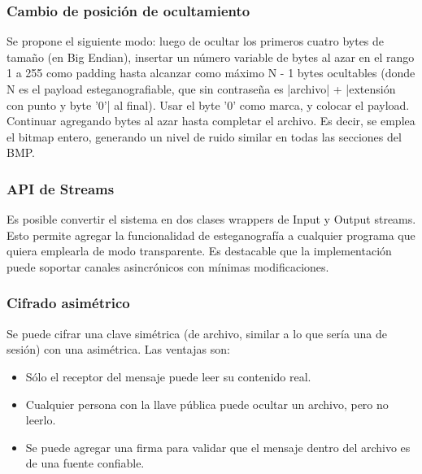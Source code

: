 \subsubsection{Cambio de posición de ocultamiento}

Se propone el siguiente modo: luego de ocultar los primeros cuatro bytes de tamaño (en Big Endian), insertar un número variable de bytes al azar en el rango 1 a 255 como padding hasta alcanzar como máximo N - 1 bytes ocultables (donde N es el payload esteganografiable, que sin contraseña es |archivo| + |extensión con punto y byte '0'| al final). Usar el byte '0' como marca, y colocar el payload. Continuar agregando bytes al azar hasta completar el archivo. Es decir, se emplea el bitmap entero, generando un nivel de ruido similar en todas las secciones del BMP.

\subsubsection{API de Streams}
Es posible convertir el sistema en dos clases wrappers de Input y Output streams. Esto permite agregar la funcionalidad de esteganografía a cualquier programa que quiera emplearla de modo transparente. Es destacable que la implementación puede soportar canales asincrónicos con mínimas modificaciones.


\subsubsection{Cifrado asimétrico}

Se puede cifrar una clave simétrica (de archivo, similar a lo que sería una de sesión) con una asimétrica. Las ventajas son:
\begin{itemize}
\item Sólo el receptor del mensaje puede leer su contenido real.
\item Cualquier persona con la llave pública puede ocultar un archivo, pero no leerlo.
\item Se puede agregar una firma para validar que el mensaje dentro del archivo es de una fuente confiable.
\end{itemize}
